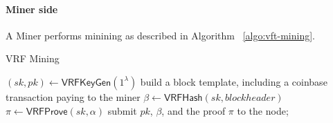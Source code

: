 
\paragraph{Miner side}
\newblock
\newline
A Miner performs minining as described in Algorithm ~\ref{algo:vft-mining}.
\begin{algorithm}[H]
\caption{VRF Mining}
\label{algo:vft-mining}
\SetAlgoLined
  $(sk, pk) \gets \mathsf{VRFKeyGen}(1^{\lambda})$\;
  build a block template, including a coinbase transaction paying to the miner\;
  $\beta \gets \mathsf{VRFHash}(sk, blockheader)$\;
  $\pi \gets \mathsf{VRFProve}(sk, \alpha)$\;
  submit $pk$, $\beta$, and the proof $\pi$ to the node;
\end{algorithm}

